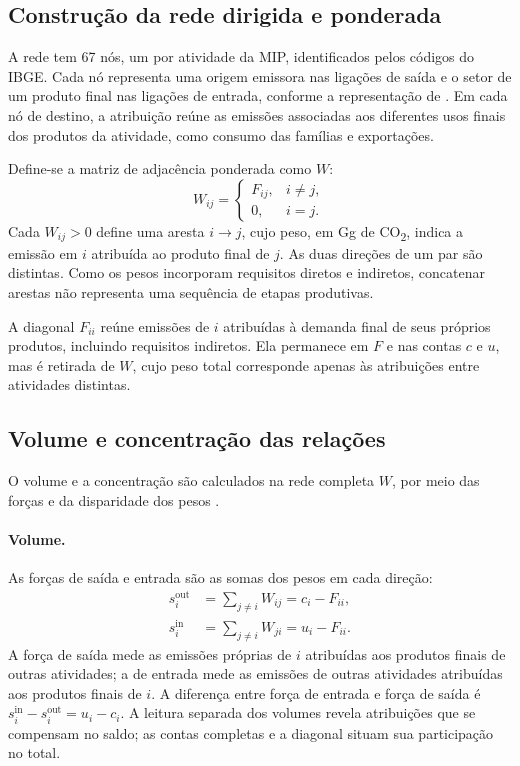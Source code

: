 \subsection{Construção da rede dirigida e ponderada}
\label{sec:construcao-rede}

A rede tem 67 nós, um por atividade da MIP, identificados pelos códigos do IBGE. Cada nó representa uma origem emissora nas ligações de saída e o setor de um produto final nas ligações de entrada, conforme a representação de \textcite{huang2019}. Em cada nó de destino, a atribuição reúne as emissões associadas aos diferentes usos finais dos produtos da atividade, como consumo das famílias e exportações.

Define-se a matriz de adjacência ponderada como $W$:
\begin{equation}
W_{ij}=\begin{cases}
F_{ij}, & i\ne j,\\
0, & i=j.
\end{cases}
\label{eq:rede-sem-diagonal}
\end{equation}
Cada $W_{ij}>0$ define uma aresta $i\rightarrow j$, cujo peso, em Gg de CO\textsubscript{2}, indica a emissão em $i$ atribuída ao produto final de $j$. As duas direções de um par são distintas. Como os pesos incorporam requisitos diretos e indiretos, concatenar arestas não representa uma sequência de etapas produtivas.

A diagonal $F_{ii}$ reúne emissões de $i$ atribuídas à demanda final de seus próprios produtos, incluindo requisitos indiretos. Ela permanece em $F$ e nas contas $c$ e $u$, mas é retirada de $W$, cujo peso total corresponde apenas às atribuições entre atividades distintas.

\subsection{Volume e concentração das relações}
\label{sec:volume-concentracao}

O volume e a concentração são calculados na rede completa $W$, por meio das forças e da disparidade dos pesos \parencite{huang2019,serrano2009}.

\paragraph{Volume.}
As forças de saída e entrada são as somas dos pesos em cada direção:
\begin{equation}
\begin{aligned}
s_i^{\mathrm{out}}&=\sum_{j\ne i}W_{ij}=c_i-F_{ii},\\
s_i^{\mathrm{in}}&=\sum_{j\ne i}W_{ji}=u_i-F_{ii}.
\end{aligned}
\label{eq:forcas-externas}
\end{equation}
A força de saída mede as emissões próprias de $i$ atribuídas aos produtos finais de outras atividades; a de entrada mede as emissões de outras atividades atribuídas aos produtos finais de $i$. A diferença entre força de entrada e força de saída é $s_i^{\mathrm{in}}-s_i^{\mathrm{out}}=u_i-c_i$. A leitura separada dos volumes revela atribuições que se compensam no saldo; as contas completas e a diagonal situam sua participação no total.

